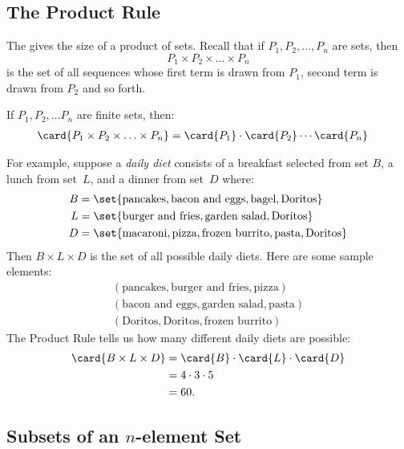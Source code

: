 \subsection{The Product Rule}

The  gives the size of a product of sets.  Recall
that if $P_1, P_2, \ldots, P_n$ are sets, then
%
\[
P_1 \times P_2 \times \ldots \times P_n
\]
%
is the set of all sequences whose first term is drawn from $P_1$,
second term is drawn from $P_2$ and so forth.

\begin{rul}
If $P_1, P_2, \ldots P_n$ are finite sets, then:
%
\begin{align*}
\card{P_1 \times P_2 \times \ldots \times P_n}
    & = \card{P_1} \cdot \card{P_2} \cdots \card{P_n}
\end{align*}
\end{rul}

For example, suppose a \emph{daily diet}
consists of a breakfast selected from set $B$, a lunch from set~$L$,
and a dinner from set~$D$ where:
%
\begin{align*}
B & = \set{\text{pancakes},
      	   \text{bacon and eggs},
           \text{bagel},
           \text{Doritos}} \\
L & = \set{\text{burger and fries},
           \text{garden salad},
           \text{Doritos}} \\
D & = \set{\text{macaroni},
           \text{pizza},
           \text{frozen burrito},
           \text{pasta},
           \text{Doritos}}
\end{align*}
%
Then $B \times L \times D$ is the set of all possible daily diets.
Here are some sample elements:
%
\begin{gather*}
(\text{pancakes}, \text{burger and fries}, \text{pizza}) \\
(\text{bacon and eggs}, \text{garden salad}, \text{pasta}) \\
(\text{Doritos}, \text{Doritos}, \text{frozen burrito})
\end{gather*}
%
The Product Rule tells us how many different daily diets are possible:
%
\begin{align*}
\card{B \times L \times D}
    & = \card{B} \cdot \card{L} \cdot \card{D} \\
    & = 4 \cdot 3 \cdot 5 \\
    & = 60.
\end{align*}

\subsection{Subsets of an $n$-element Set}\label{2nsubsets}

